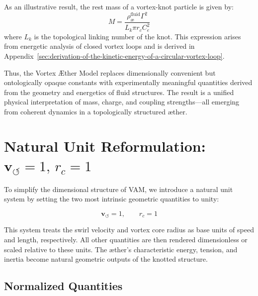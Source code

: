 \documentclass[12pt]{article}
\begin{document}
\noindent As an illustrative result, the rest mass of a vortex-knot particle is given by:
\[
M = \frac{\rho_\text{\ae}^{\text{fluid}} \Gamma^2}{L_k \pi r_c C_e^2}
\]
where \( L_k \) is the topological linking number of the knot. This expression arises from energetic analysis of closed vortex loops and is derived in Appendix~\ref{sec:derivation-of-the-kinetic-energy-of-a-circular-vortex-loop}.

\vspace{0.5em}

Thus, the Vortex Æther Model replaces dimensionally convenient but ontologically opaque constants with experimentally meaningful quantities derived from the geometry and energetics of fluid structures. The result is a unified physical interpretation of mass, charge, and coupling strengths—all emerging from coherent dynamics in a topologically structured æther.

\section*{Natural Unit Reformulation: \( \mathbf{v}_{\scriptscriptstyle\boldsymbol{\circlearrowleft}} = 1, \, r_c = 1 \)}

To simplify the dimensional structure of VAM, we introduce a natural unit system by setting the two most intrinsic geometric quantities to unity:

\[
\mathbf{v}_{\scriptscriptstyle\boldsymbol{\circlearrowleft}} = 1, \qquad r_c = 1
\]

This system treats the swirl velocity and vortex core radius as base units of speed and length, respectively. All other quantities are then rendered dimensionless or scaled relative to these units. The æther's characteristic energy, tension, and inertia become natural geometric outputs of the knotted structure.

\subsection*{Normalized Quantities}
\end{document}
